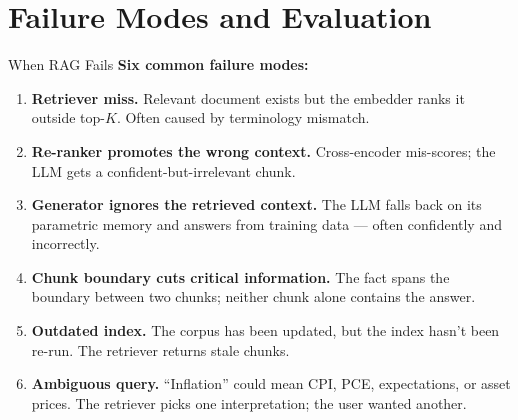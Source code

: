\section{Failure Modes and Evaluation}

\begin{frame}{When RAG Fails}
\textbf{Six common failure modes:}
\begin{enumerate}
\item \textbf{Retriever miss.} Relevant document exists but the embedder ranks it outside top-$K$. Often caused by terminology mismatch.

\medskip
\item \textbf{Re-ranker promotes the wrong context.} Cross-encoder mis-scores; the LLM gets a confident-but-irrelevant chunk.

\medskip
\item \textbf{Generator ignores the retrieved context.} The LLM falls back on its parametric memory and answers from training data --- often confidently and incorrectly.

\medskip
\item \textbf{Chunk boundary cuts critical information.} The fact spans the boundary between two chunks; neither chunk alone contains the answer.

\medskip
\item \textbf{Outdated index.} The corpus has been updated, but the index hasn't been re-run. The retriever returns stale chunks.

\medskip
\item \textbf{Ambiguous query.} ``Inflation'' could mean CPI, PCE, expectations, or asset prices. The retriever picks one interpretation; the user wanted another.
\end{enumerate}
\end{frame}

